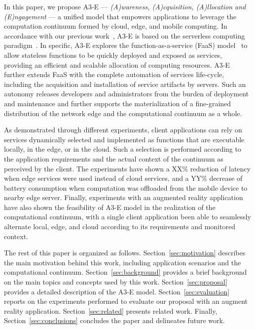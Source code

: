 In this paper, we propose A3-E --- \textit{(A)wareness, (A)cquisition, (A)llocation and (E)ngagement} --- a unified model that empowers applications to leverage the computation continuum formed by cloud, edge, and mobile computing. In accordance with our previous work~\cite{GarrigaMendonca2017}, A3-E is based on the serverless computing paradigm~\cite{Hendrickson:2016,baldini2017serverless}. In specific, A3-E explores the function-as-a-service (FaaS) model~\cite{MateosFaaster17} to allow stateless functions to be quickly deployed and exposed as services, providing an efficient and scalable allocation of computing resources. A3-E further extends FaaS with the complete automation of services life-cycle, including the acquisition and installation of service artifacts by servers. Such an autonomy releases developers and administrators from the burden of deployment and maintenance and further supports the materialization of a fine-grained distribution of the network edge and the computational continuum as a whole. %


As demonstrated through different experiments, client applications can rely on services dynamically selected and implemented as functions that are executable locally, in the edge, or in the cloud. Such a selection is performed according to the application requirements and the actual context of the continuum as perceived by the client. The experiments have shown a XX\% reduction of latency when edge services were used instead of cloud services, and a YY\% decrease of battery consumption when computation was offloaded from the mobile device to nearby edge server. Finally, experiments with an augmented reality application have also shown the feasibility of A3-E model in the realization of the computational continuum, with a single client application been able to seamlessly alternate local, edge, and cloud according to its requirements and monitored context.




The rest of this paper is organized as follows. Section~\ref{sec:motivation} describes the main motivation behind this work, including application scenarios and the computational continuum. Section~\ref{sec:background} provides a brief background on the main topics and concepts used by this work. Section~\ref{sec:proposal} provides a detailed description of the A3-E model. Section~\ref{sec:evaluation} reports on the experiments performed to evaluate our proposal with an augment reality application. Section~\ref{sec:related} presents related work. Finally, Section~\ref{sec:conclusions} concludes the paper and delineates future work.





